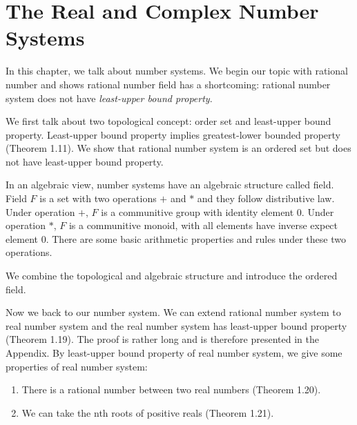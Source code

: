 % 
\chapter{The Real and Complex Number Systems}
In this chapter, we talk about number systems. We begin our topic with rational number and shows rational number field has
a shortcoming: rational number system does not have \emph{least-upper bound property}.\par 
We first talk about two topological concept: order set and least-upper bound property. Least-upper bound property implies greatest-lower bounded property (Theorem 1.11). We show that rational number system is an ordered set but does not have least-upper bound property.\par
In an algebraic view, number systems have an algebraic structure called field. Field $F$ is a set with two operations $+$ and $*$ and they follow distributive law. Under operation $+$, $F$ is a communitive group with identity element 0. Under operation $*$, $F$ is a communitive monoid, with all elements have inverse expect element 0. There are some basic arithmetic properties and rules under these two operations.\par
We combine the topological and algebraic structure and introduce the ordered field.\par
Now we back to our number system. We can extend rational number system to real number system and the real number system has least-upper bound property (Theorem 1.19). The proof is rather long and is therefore presented in the Appendix. By least-upper bound property of real number system, we give some properties of real number system:
\begin{enumerate}
    \item There is a rational number between two real numbers (Theorem 1.20).
    \item We can take the nth roots of positive reals (Theorem 1.21).
\end{enumerate}\par
